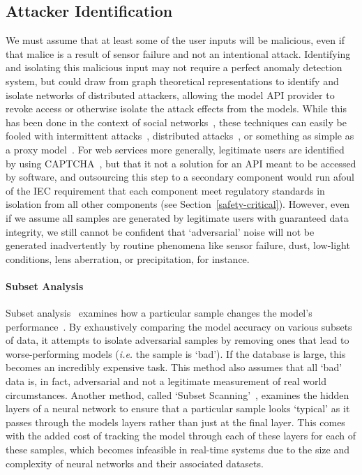 \documentclass[lettersize,journal]{IEEEtran}
\newcommand{\ie}{\textit{i.e.}\xspace}
\begin{document}
\subsection{Attacker Identification}

We must assume that at least some of the user inputs will be malicious, even if that malice is a result of sensor failure and not an intentional attack. Identifying and isolating this malicious input may not require a perfect anomaly detection system, but could draw from graph theoretical representations to identify and isolate networks of distributed attackers, allowing the model API provider to revoke access or otherwise isolate the attack effects from the models. While this has been done in the context of social networks~\cite{daya_graph-based_2019}, these techniques can easily be fooled with intermittent attacks~\cite{intermittent}, distributed attacks~\cite{distributed_attacks}, or something as simple as a proxy model~\cite{hopskipjump}. For web services more generally, legitimate users are identified by using CAPTCHA~\cite{ahn2003captcha}, but that it not a solution for an API meant to be accessed by software, and outsourcing this step to a secondary component would run afoul of the IEC requirement that each component meet regulatory standards in isolation from all other components (see Section~\ref{safety-critical}). However, even if we assume all samples are generated by legitimate users with guaranteed data integrity, we still cannot be confident that `adversarial' noise will not be generated inadvertently by routine phenomena like sensor failure, dust, low-light conditions, lens aberration, or precipitation, for instance.


\paragraph{Subset Analysis}

Subset analysis~\cite{paudice_detection_2018} examines how a particular sample changes the model's performance~\cite{paudice_detection_2018}. By exhaustively comparing the model accuracy on various subsets of data, it attempts to isolate adversarial samples by removing ones that lead to worse-performing models (\ie the sample is `bad'). If the database is large, this becomes an incredibly expensive task. This method also assumes that all `bad' data is, in fact, adversarial and not a legitimate measurement of real world circumstances. Another method, called `Subset Scanning'~\cite{cintas_detecting_2020}, examines the hidden layers of a neural network to ensure that a particular sample looks `typical' as it passes through the models layers rather than just at the final layer. This comes with the added cost of tracking the model through each of these layers for each of these samples, which becomes infeasible in real-time systems due to the size and complexity of neural networks and their associated datasets.
\end{document}
